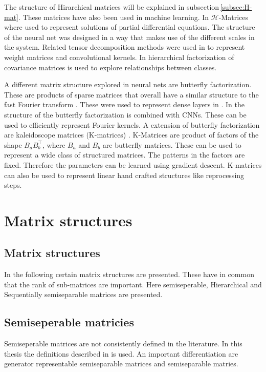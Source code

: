 \documentclass[doctype=mastersthesis,BCOR=15mm,biblatex]{ldvbook}%
\begin{document}
The structure of Hirarchical matrices will be explained in subsection\,\ref{subsec:H-mat}. These matrices have also been used in machine learning. 
In \cite{fan_multiscale_2019} $\mathcal{H}$-Matrices where used to represent solutions of partial differential equations. The structure of the neural net was designed in a way that makes use of the different scales in the system.
Related tensor decomposition methods were used in \cite{wu_hybrid_2020} to represent weight matrices and convolutional kernels.
In \cite{ithapu_decoding_2017} hierarchical factorization of covariance matrices is used to explore relationships between classes.

A different matrix structure explored in neural nets are butterfly factorization. 
These are products of sparse matrices that overall have a similar structure to the fast Fourier transform \cite{li_butterfly_2015,parker_random_1995}. These were used to represent dense layers in \cite{ailon_sparse_2021}.
In \cite{li_butterfly-net_2020} the structure of the butterfly factorization is combined with CNNs. These can be used to efficiently represent Fourier kernels.
A extension of butterfly factorization are kaleidoscope matrices (K-matrices) \cite{dao_kaleidoscope_2020}.
K-Matrices are product of factors of the shape $B_aB_b^\top$, where $B_a$ and $B_b$ are butterfly matrices. These can be used to represent a wide class of structured matrices.
The patterns in the factors are fixed. Therefore the parameters can be learned using gradient descent.
K-matrices can also be used to represent linear hand crafted structures like reprocessing steps. %




\section{Matrix structures}

\subsection{Matrix structures}
In the following certain matrix structures are presented.
These have in common that the rank of sub-matrices are important.
Here semiseperable, Hierarchical and Sequentially semiseparable matrices are presented.

\subsection{Semiseperable matricies}
Semiseperable matrices are not consistently defined in the literature. 
In this thesis the definitions described in \cite{vandebril_bibliography_2005,vandebril_matrix_2007} is used.
An important differentiation are generator representable semiseparable matrices and semiseparable matries.
\end{document}
